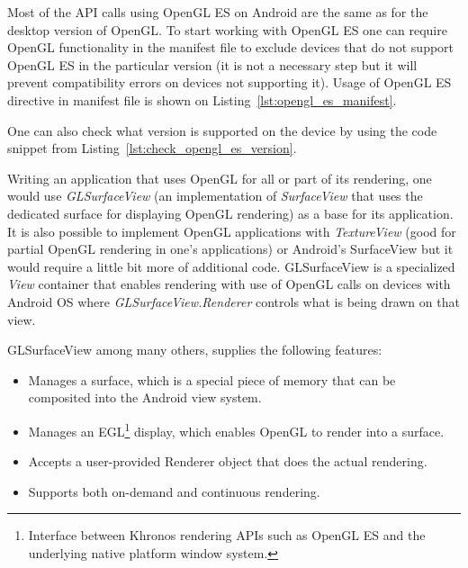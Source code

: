 
Most of the API calls using OpenGL ES on Android are the same as for the desktop version of OpenGL. 
To start working with OpenGL ES one can require OpenGL functionality in the manifest file to exclude devices that do not support OpenGL ES in the particular version (it is not a necessary step but it will prevent compatibility errors on devices not supporting it).
Usage of OpenGL ES directive in manifest file is shown on Listing~\ref{lst:opengl_es_manifest}.



%  

One can also check what version is supported on the device by using the code snippet from Listing~\ref{lst:check_opengl_es_version}.
\begin{filecode}[label=lst:check_opengl_es_version,caption=Checking OpenGL ES version support on the device.]
  
\end{filecode}

%

Writing an application that uses OpenGL for all or part of its rendering, one would use \emph{GLSurfaceView} (an implementation of \emph{SurfaceView} that uses the dedicated surface for displaying OpenGL rendering) \cite{android_glsurfaceview} as a base for its application.
It is also possible to implement OpenGL applications with \emph{TextureView} (good for partial OpenGL rendering in one's applications) or Android's SurfaceView but it would require a little bit more of additional code.
\newline GLSurfaceView is a specialized \emph{View} container that enables rendering with use of OpenGL calls on devices with Android OS where \emph{GLSurfaceView.Renderer} controls what is being drawn on that view.

GLSurfaceView among many others, supplies the following features:
\begin{itemize}
\item Manages a surface, which is a special piece of memory that can be composited into the Android view system.
\item Manages an EGL\footnote{Interface between Khronos rendering APIs such as OpenGL ES and the underlying native platform window system.} display, which enables OpenGL to render into a surface.
\item Accepts a user-provided Renderer object that does the actual rendering.
\item Supports both on-demand and continuous rendering.
\end{itemize}

